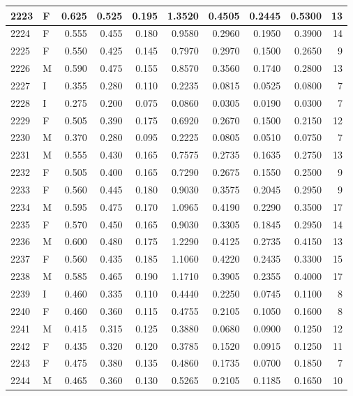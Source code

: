\documentclass[9pt,twocolumn,twoside,]{pnas-new}
\begin{document}
\begin{tabular}{l|l|r|r|r|r|r|r|r|r}
\hline
2223 & F & 0.625 & 0.525 & 0.195 & 1.3520 & 0.4505 & 0.2445 & 0.5300 & 13\\
\hline
2224 & F & 0.555 & 0.455 & 0.180 & 0.9580 & 0.2960 & 0.1950 & 0.3900 & 14\\
\hline
2225 & F & 0.550 & 0.425 & 0.145 & 0.7970 & 0.2970 & 0.1500 & 0.2650 & 9\\
\hline
2226 & M & 0.590 & 0.475 & 0.155 & 0.8570 & 0.3560 & 0.1740 & 0.2800 & 13\\
\hline
2227 & I & 0.355 & 0.280 & 0.110 & 0.2235 & 0.0815 & 0.0525 & 0.0800 & 7\\
\hline
2228 & I & 0.275 & 0.200 & 0.075 & 0.0860 & 0.0305 & 0.0190 & 0.0300 & 7\\
\hline
2229 & F & 0.505 & 0.390 & 0.175 & 0.6920 & 0.2670 & 0.1500 & 0.2150 & 12\\
\hline
2230 & M & 0.370 & 0.280 & 0.095 & 0.2225 & 0.0805 & 0.0510 & 0.0750 & 7\\
\hline
2231 & M & 0.555 & 0.430 & 0.165 & 0.7575 & 0.2735 & 0.1635 & 0.2750 & 13\\
\hline
2232 & F & 0.505 & 0.400 & 0.165 & 0.7290 & 0.2675 & 0.1550 & 0.2500 & 9\\
\hline
2233 & F & 0.560 & 0.445 & 0.180 & 0.9030 & 0.3575 & 0.2045 & 0.2950 & 9\\
\hline
2234 & M & 0.595 & 0.475 & 0.170 & 1.0965 & 0.4190 & 0.2290 & 0.3500 & 17\\
\hline
2235 & F & 0.570 & 0.450 & 0.165 & 0.9030 & 0.3305 & 0.1845 & 0.2950 & 14\\
\hline
2236 & M & 0.600 & 0.480 & 0.175 & 1.2290 & 0.4125 & 0.2735 & 0.4150 & 13\\
\hline
2237 & F & 0.560 & 0.435 & 0.185 & 1.1060 & 0.4220 & 0.2435 & 0.3300 & 15\\
\hline
2238 & M & 0.585 & 0.465 & 0.190 & 1.1710 & 0.3905 & 0.2355 & 0.4000 & 17\\
\hline
2239 & I & 0.460 & 0.335 & 0.110 & 0.4440 & 0.2250 & 0.0745 & 0.1100 & 8\\
\hline
2240 & F & 0.460 & 0.360 & 0.115 & 0.4755 & 0.2105 & 0.1050 & 0.1600 & 8\\
\hline
2241 & M & 0.415 & 0.315 & 0.125 & 0.3880 & 0.0680 & 0.0900 & 0.1250 & 12\\
\hline
2242 & F & 0.435 & 0.320 & 0.120 & 0.3785 & 0.1520 & 0.0915 & 0.1250 & 11\\
\hline
2243 & F & 0.475 & 0.380 & 0.135 & 0.4860 & 0.1735 & 0.0700 & 0.1850 & 7\\
\hline
2244 & M & 0.465 & 0.360 & 0.130 & 0.5265 & 0.2105 & 0.1185 & 0.1650 & 10\\

\end{tabular}
\end{document}
